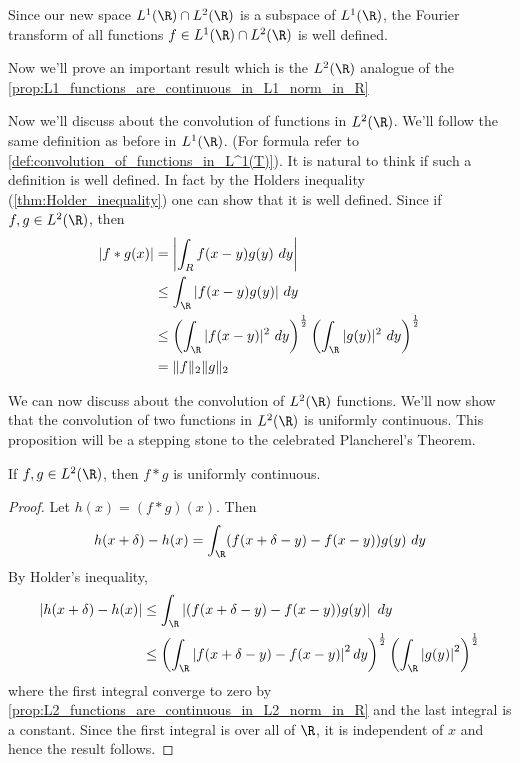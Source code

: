 Since our new space $L^1(\R) \cap L^2(\R)$ is a subspace of $L^1(\R)$, the Fourier transform of all functions $f \in L^1(\R) \cap L^2(\R)$ is well defined. 

Now we'll prove an important result which is the $L^2(\R)$ analogue of the \autoref{prop:L1_functions_are_continuous_in_L1_norm_in_R}

Now we'll discuss about the convolution of functions in $L^2(\R)$. We'll follow the same definition as before in $L^1(\R)$. (For formula refer to \autoref{def:convolution_of_functions_in_L^1(T)}). It is natural to think if such a definition is well defined. In fact by the Holders inequality (\autoref{thm:Holder_inequality}) one can show that it is well defined. Since if $f, g \in L^2(\R)$, then 
  \begin{align*}
    |f*g(x)| &= \left|\int_R f(x-y)g(y) \ dy \right|\\
        &\le \int_\R |f(x-y)g(y)| \ dy \\
        &\le \left(\int_\R |f(x-y)|^2 \ dy \right)^{\frac{1}{2}} \left(\int_\R |g(y)|^2 \ dy \right)^{\frac{1}{2}} \\
        &= \|f\|_2 \|g\|_2
  \end{align*}

We can now discuss about the convolution of $L^2(\R)$ functions. We'll now show that the convolution of two functions in $L^2(\R)$ is uniformly continuous. This proposition will be a stepping stone to the celebrated Plancherel's Theorem.

  \begin{proposition}
    If $f, g \in L^2(\R)$, then $f*g$ is uniformly continuous.
  \end{proposition}
  \begin{proof}
    Let $h(x) = (f*g)(x)$. Then $$h(x+\delta) - h(x) = \int_\R (f(x+\delta - y) - f(x-y)) g(y) \ dy$$
    By Holder's inequality, 
    \begin{align*}
      |h(x+\delta) - h(x)| &\le \int_\R \left|(f(x+\delta - y) - f(x-y)) g(y) \right| \ dy \\
      &\le \left( \int_\R \left|f(x+\delta - y) - f(x-y) \right|^2 dy\right)^{\frac{1}{2}} \left( \int_\R \left|g(y)\right|^2 \right)^{\frac{1}{2}}
    \end{align*}
    where the first integral converge to zero by \autoref{prop:L2_functions_are_continuous_in_L2_norm_in_R} and the last integral is a constant. Since the first integral is over all of $\R$, it is independent of $x$ and hence the result follows.
  \end{proof}


